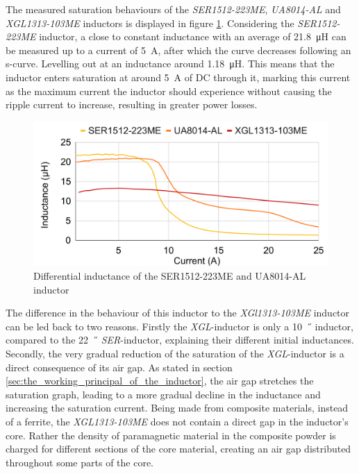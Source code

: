 The measured saturation behaviours of the \textit{SER1512-223ME}, \textit{UA8014-AL} and \textit{XGL1313-103ME} inductors is displayed in figure \ref{fig:differential_inductance_of_the_ser1512-223me_inductor}. Considering the \textit{SER1512-223ME} inductor, a close to constant inductance with an average of \SI{21.8}{\micro\henry} can be measured up to a current of \SI{5}{\A}, after which the curve decreases following an s-curve. Levelling out at an inductance around \SI{1.18}{\micro\henry}. This means that the inductor enters saturation at around \SI{5}{\A} of \ac{DC} through it, marking this current as the maximum current the inductor should experience without causing the ripple current to increase, resulting in greater power losses.
\begin{figure}[H]
    \centering
    \includegraphics[width=0.8\linewidth]{Bilder//Kapitel3/SER223_UA_XGL103_Saturation.pdf}
    \caption{Differential inductance of the SER1512-223ME and UA8014-AL inductor}
    \label{fig:differential_inductance_of_the_ser1512-223me_inductor}
\end{figure}
The difference in the behaviour of this inductor to the \textit{XGl1313-103ME} inductor can be led back to two reasons. Firstly the \textit{XGL}-inductor is only a \SI{10}{\micro\H} inductor, compared to the \SI{22}{\micro\H} \textit{SER}-inductor, explaining their different initial inductances. Secondly, the very gradual reduction of the saturation of the \textit{XGL}-inductor is a direct consequence of its air gap. As stated in section \ref{sec:the_working_principal_of_the_inductor}, the air gap stretches the saturation graph, leading to a more gradual decline in the inductance and increasing the saturation current.
Being made from composite materials, instead of a ferrite, the \textit{XGL1313-103ME} does not contain a direct gap in the inductor's core. Rather the density of paramagnetic material in the composite powder is charged for different sections of the core material, creating an air gap distributed throughout some parts of the core.

